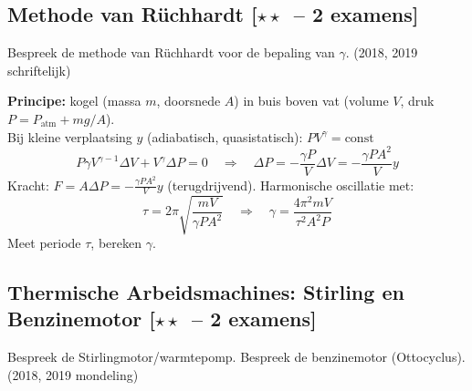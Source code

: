 \documentclass[10pt,a4paper]{article}
\begin{document}
\subsection{Methode van Rüchhardt \textnormal{\color{warningred}[$\star\star$\ -- 2 examens]}}

\begin{theorievraag}{Bespreek de methode van Rüchhardt voor de bepaling van $\gamma$. \textnormal{(2018, 2019 schriftelijk)}}
\end{theorievraag}

\begin{oplossing}
\textbf{Principe:} kogel (massa $m$, doorsnede $A$) in buis boven vat (volume $V$, druk $P = P_\text{atm} + mg/A$).\\
Bij kleine verplaatsing $y$ (adiabatisch, quasistatisch): $PV^\gamma = \text{const}$
$$P\gamma V^{\gamma-1}\Delta V + V^\gamma\Delta P = 0 \quad \Rightarrow \quad \Delta P = -\frac{\gamma P}{V}\Delta V = -\frac{\gamma P A^2}{V}y$$
Kracht: $F = A\Delta P = -\frac{\gamma P A^2}{V}y$ (terugdrijvend). Harmonische oscillatie met:
$$\tau = 2\pi\sqrt{\frac{mV}{\gamma P A^2}} \quad \Rightarrow \quad \boxed{\gamma = \frac{4\pi^2 mV}{\tau^2 A^2 P}}$$
Meet periode $\tau$, bereken $\gamma$.
\end{oplossing}

\subsection{Thermische Arbeidsmachines: Stirling en Benzinemotor \textnormal{\color{warningred}[$\star\star$\ -- 2 examens]}}

\begin{theorievraag}{Bespreek de Stirlingmotor/warmtepomp. Bespreek de benzinemotor (Ottocyclus). \textnormal{(2018, 2019 mondeling)}}
\end{theorievraag}
\end{document}
